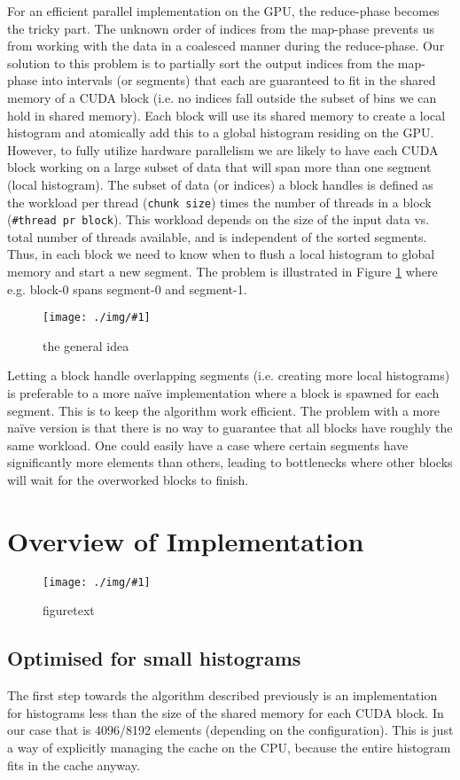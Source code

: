\documentclass[12pt, a4paper, hidelinks]{article}
\newcommand{\fig}[2]{
\begin{figure}[h]
  \begin{center}
    \texttt{[image: ./img/\#1]}
  \end{center}
  \caption{#2}
  \label{fig:#1}
\end{figure}
}
\renewcommand{\tt}[1]{\texttt{#1}}
\begin{document}
For an efficient parallel implementation on the GPU,
the reduce-phase becomes the tricky part.
The unknown order of indices from the map-phase prevents us
from working with the data in a coalesced manner during the reduce-phase.
Our solution to this problem is to partially sort the output indices from the
map-phase into intervals (or segments) that each are guaranteed to fit in the
shared memory of a CUDA block (i.e. no indices fall outside the subset of bins
we can hold in shared memory).
Each block will use its shared memory to create a local histogram
and atomically add this to a global histogram residing on the GPU.
However, to fully utilize hardware parallelism we are likely to have
each CUDA block working on a large subset of data that will
span more than one segment (local histogram).
The subset of data (or indices) a block handles is defined as the workload per thread
(\tt{chunk size}) times the number of threads in a block (\tt{#thread pr block}).
This workload depends on the size of the input data vs.
total number of threads available, and is independent of the sorted segments.
Thus, in each block we need to know when to flush a local histogram to global
memory and start a new segment.
The problem is illustrated in Figure \ref{fig:overview} where e.g.
block-0 spans segment-0 and segment-1.

\fig{overview}{the general idea}

Letting a block handle overlapping segments (i.e. creating more local histograms)
is preferable to a more naïve implementation where a block is spawned
for each segment. This is to keep the algorithm work efficient.
The problem with a more naïve version is that there is no way
to guarantee that all blocks have roughly the same workload.
One could easily have a case where certain segments have significantly
more elements than others, leading to bottlenecks where other blocks will
wait for the overworked blocks to finish.

\section{Overview of Implementation}
\fig{device-dia}{figuretext}

\subsection{Optimised for small histograms}
The first step towards the algorithm described previously is an implementation
for histograms less than the size of the shared memory for each CUDA block.
In our case that is 4096/8192 elements (depending on the configuration).
This is just a way of explicitly managing the cache on the CPU, because the
entire histogram fits in the cache anyway.
\end{document}
